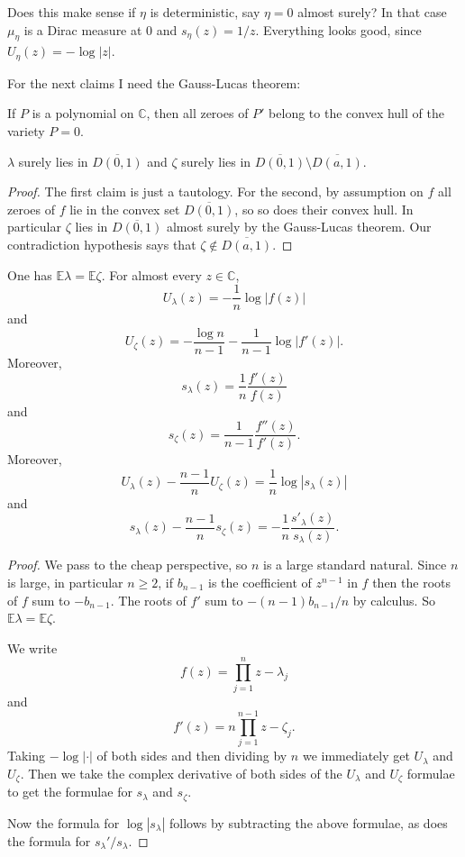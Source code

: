 \documentclass[12pt]{article}
\newcommand{\CC}{\mathbb{C}}
\newcommand{\EE}{\mathbb E}
\begin{document}
Does this make sense if $\eta$ is deterministic, say $\eta = 0$ almost surely? In that case $\mu_\eta$ is a Dirac measure at $0$ and $s_\eta(z) = 1/z$.
Everything looks good, since $U_\eta(z) = -\log |z|$.

For the next claims I need the Gauss-Lucas theorem:
\begin{theorem}
If $P$ is a polynomial on $\CC$, then all zeroes of $P'$ belong to the convex hull of the variety $P = 0$.
\end{theorem}

\begin{lemma}
$\lambda$ surely lies in $\overline{D(0, 1)}$ and $\zeta$ surely lies in $\overline{D(0, 1)} \setminus \overline{D(a, 1)}$.
\end{lemma}
\begin{proof}
The first claim is just a tautology.
For the second, by assumption on $f$ all zeroes of $f$ lie in the convex set $\overline{D(0, 1)}$, so so does their convex hull.
In particular $\zeta$ lies in $\overline{D(0, 1)}$ almost surely by the Gauss-Lucas theorem.
Our contradiction hypothesis says that $\zeta \notin \overline{D(a, 1)}$.
\end{proof}

\begin{lemma}
One has $\EE\lambda = \EE\zeta$. For almost every $z \in \CC$,
$$U_\lambda(z) = -\frac{1}{n} \log |f(z)|$$
and
$$U_\zeta(z) = -\frac{\log n}{n - 1} - \frac{1}{n - 1} \log |f'(z)|.$$
Moreover,
$$s_\lambda(z) = \frac{1}{n} \frac{f'(z)}{f(z)}$$
and
$$s_\zeta(z) = \frac{1}{n - 1} \frac{f''(z)}{f'(z)}.$$
Moreover,
$$U_\lambda(z) - \frac{n-1}{n}U_\zeta(z) = \frac{1}{n} \log |s_\lambda(z)|$$
and
$$s_\lambda(z) - \frac{n - 1}{n} s_\zeta(z) = -\frac{1}{n} \frac{s'_\lambda(z)}{s_\lambda(z)}.$$
\end{lemma}
\begin{proof}
We pass to the cheap perspective, so $n$ is a large standard natural.
Since $n$ is large, in particular $n \geq 2$, if $b_{n-1}$ is the coefficient of $z^{n-1}$ in $f$ then the roots of $f$ sum to $-b_{n-1}$.
The roots of $f'$ sum to $-(n-1)b_{n-1}/n$ by calculus. So $\EE\lambda = \EE\zeta$.

We write
$$f(z) = \prod_{j=1}^n z - \lambda_j$$
and
$$f'(z) = n\prod_{j=1}^{n-1} z - \zeta_j.$$
Taking $-\log|\cdot|$ of both sides and then dividing by $n$ we immediately get $U_\lambda$ and $U_\zeta$.
Then we take the complex derivative of both sides of the $U_\lambda$ and $U_\zeta$ formulae to get the formulae for $s_\lambda$ and $s_\zeta$.

Now the formula for $\log |s_\lambda|$ follows by subtracting the above formulae, as does the formula for $s_\lambda'/s_\lambda$.
\end{proof}
\end{document}
